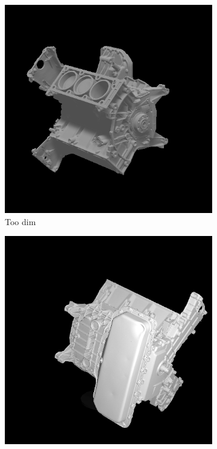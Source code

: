 \documentclass[border=15pt, multi, tikz]{article}
\begin{document}
\begin{figure}[H]
	\centering
	\begin{subfigure}[b]{0.32\linewidth}
		\includegraphics[width=\textwidth]{./Figures/wrong_exposure_2.png}
		\caption{Too dim}
	\end{subfigure}
	\begin{subfigure}[b]{0.32\linewidth}
	\includegraphics[width=\textwidth]{./Figures/right_exposure.png}

\end{subfigure}
\end{figure}
\end{document}
